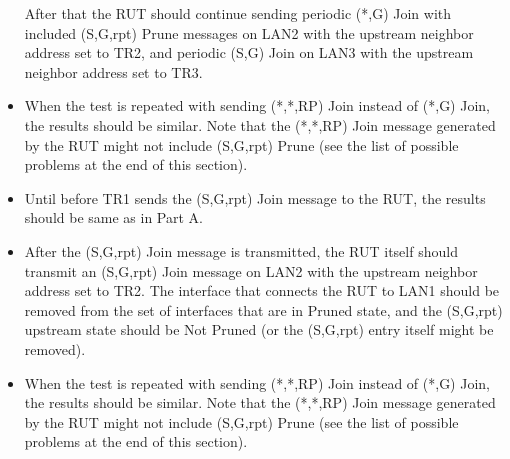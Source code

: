 \documentclass[11pt]{report}
\begin{document}
\begin{itemize}
  After that the RUT should continue sending periodic (*,G) Join
  with included (S,G,rpt) Prune messages on LAN2 with the upstream neighbor
  address set to TR2, and periodic (S,G) Join on LAN3 with the upstream
  neighbor address set to TR3.

  \item When the test is repeated with sending (*,*,RP) Join instead of (*,G)
  Join, the results should be similar.
  Note that the (*,*,RP) Join message generated by the RUT might not include
  (S,G,rpt) Prune (see the list of possible problems at the end of this
  section).

\end{itemize}


\begin{itemize}

  \item Until before TR1 sends the (S,G,rpt) Join message to the RUT, the
  results should be same as in Part A.

  \item After the (S,G,rpt) Join message is transmitted, the RUT itself should
  transmit an (S,G,rpt) Join message on LAN2 with the upstream neighbor
  address set to TR2. The interface that connects the RUT to LAN1 should be
  removed from the set of interfaces that are in Pruned state, and the
  (S,G,rpt) upstream state should be Not Pruned (or the (S,G,rpt) entry itself
  might be removed).

  \item When the test is repeated with sending (*,*,RP) Join instead of (*,G)
  Join, the results should be similar.
  Note that the (*,*,RP) Join message generated by the RUT might not include
  (S,G,rpt) Prune (see the list of possible problems at the end of this
  section).

\end{itemize}

\end{document}

